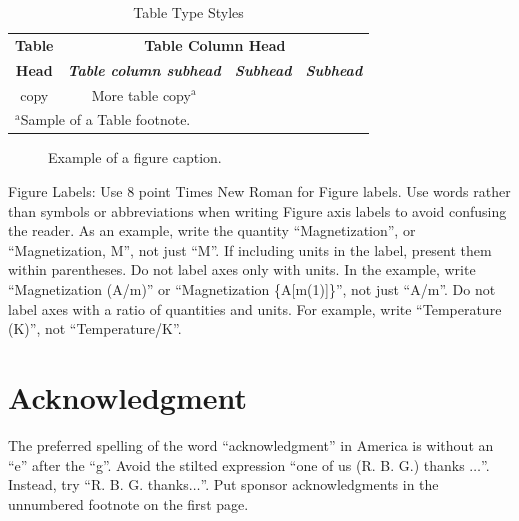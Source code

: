 \documentclass[conference]{IEEEtran}
\begin{document}
\begin{table}[htbp]
\caption{Table Type Styles}
\begin{center}
\begin{tabular}{|c|c|c|c|}
\hline
\textbf{Table}&\multicolumn{3}{|c|}{\textbf{Table Column Head}} \\
\cline{2-4} 
\textbf{Head} & \textbf{\textit{Table column subhead}}& \textbf{\textit{Subhead}}& \textbf{\textit{Subhead}} \\
\hline
copy& More table copy$^{\mathrm{a}}$& &  \\
\hline
\multicolumn{4}{l}{$^{\mathrm{a}}$Sample of a Table footnote.}
\end{tabular}
\label{tab1}
\end{center}
\end{table}

\begin{figure}[htbp]
\caption{Example of a figure caption.}
\label{fig}
\end{figure}

Figure Labels: Use 8 point Times New Roman for Figure labels. Use words 
rather than symbols or abbreviations when writing Figure axis labels to 
avoid confusing the reader. As an example, write the quantity 
``Magnetization'', or ``Magnetization, M'', not just ``M''. If including 
units in the label, present them within parentheses. Do not label axes only 
with units. In the example, write ``Magnetization (A/m)'' or ``Magnetization 
\{A[m(1)]\}'', not just ``A/m''. Do not label axes with a ratio of 
quantities and units. For example, write ``Temperature (K)'', not 
``Temperature/K''.

\section*{Acknowledgment}

The preferred spelling of the word ``acknowledgment'' in America is without 
an ``e'' after the ``g''. Avoid the stilted expression ``one of us (R. B. 
G.) thanks $\ldots$''. Instead, try ``R. B. G. thanks$\ldots$''. Put sponsor 
acknowledgments in the unnumbered footnote on the first page.
\end{document}
